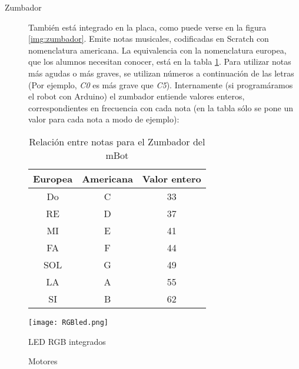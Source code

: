 \begin{description}
	\item [Zumbador] También está integrado en la placa, como puede verse en la figura \ref{img:zumbador}. Emite notas musicales, codificadas en Scratch con nomenclatura americana. La equivalencia con la nomenclatura europea, que los alumnos necesitan conocer, está en la tabla \ref{table:notasZumbador}. Para utilizar notas más agudas o más graves, se utilizan números a continuación de las letras (Por ejemplo, \textit{C0} es más grave que \textit{C5}). Internamente (si programáramos el robot con Arduino) el zumbador entiende valores enteros, correspondientes en frecuencia con cada nota (en la tabla sólo se pone un valor para cada nota a modo de ejemplo):
	\begin{table}[h]
		\centering
		\begin{tabular}{ c | c | c}	
			Europea & Americana & Valor entero \\
			\hline			
			Do & C & 33\\
			RE & D & 37\\
			MI & E & 41\\
			FA & F & 44\\
			SOL & G & 49\\
			LA & A & 55\\
			SI & B & 62\\
		\end{tabular}
	
	\caption{Relación entre notas para el Zumbador del mBot}
	\label{table:notasZumbador}
	\end{table}	
\end{description}

\begin{figure}[H]
	\texttt{[image: RGBled.png]}
	\centering
	\caption{LED RGB integrados}
	\label{img:LED}
\end{figure}

\begin{figure}[H]
	\begin{center}
		\begin{subfigure}
			[Puerto de conexión de los motores]{
				\texttt{[image: puertomotor.png]}
				\label{img:puertomotor}}
		\end{subfigure}
		\begin{subfigure}
			[Motor DC]{			
				\texttt{[image: motorDC2.png]}
				\label{img:motor1}}
		\end{subfigure}
		\begin{subfigure}
			[Motor DC: montaje con rueda]{			
				\texttt{[image: motorDC.png]}
				\label{img:motor2}}
		\end{subfigure}				
		\caption{Motores}
		\label{img:motores}
	\end{center}
\end{figure}

